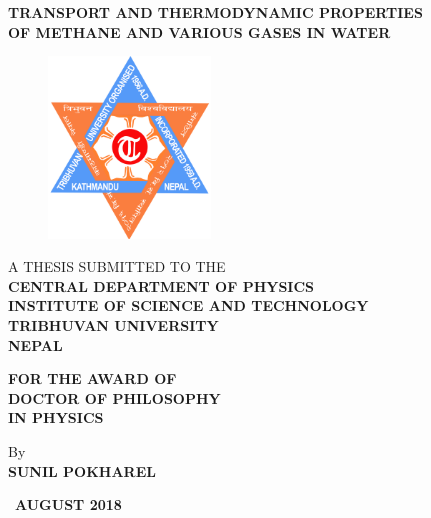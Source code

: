 \begin{titlepage}
    \centering
        {\large\bf TRANSPORT AND THERMODYNAMIC PROPERTIES \\OF METHANE AND VARIOUS GASES IN WATER}
    
    \vspace{2cm}
    
    \begin{figure}[!h]
    \centering
    \includegraphics[width = 4.3cm, keepaspectratio]{logo.png}
    \end{figure}
    
    \vspace{1cm}
    
    \begin{center}
    { A THESIS SUBMITTED TO THE \\
    \textbf{CENTRAL DEPARTMENT OF PHYSICS \\
    INSTITUTE OF SCIENCE AND TECHNOLOGY \\
    TRIBHUVAN UNIVERSITY \\
    NEPAL}}
    
    \vspace{2cm}
    
    {\bf FOR THE AWARD OF \\
    DOCTOR OF PHILOSOPHY \\
    IN PHYSICS}
    \end{center}
    
    \vspace{2cm}
    
    \begin{center}
    {\large By} \\
    {\textbf{SUNIL POKHAREL}}	
    
    \vfill
    
    {\ \bf AUGUST 2018}
    \end{center}
\end{titlepage}

